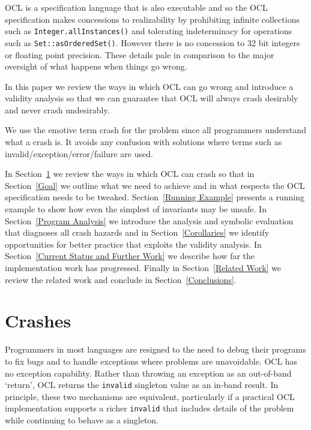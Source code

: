\documentclass[
]{ceurart}
\begin{document}
OCL is a specification language that is also executable and so the OCL specification makes concessions to realizability by prohibiting infinite collections such as \verb|Integer.allInstances()| and tolerating indeterminacy for operations such as \verb|Set::asOrderedSet()|. However there is no concession to 32 bit integers or floating point precision. These details pale in comparison to the major oversight of what happens when things go wrong.

In this paper we review the ways in  which OCL can go wrong and introduce a validity analysis so that we can guarantee that OCL will always crash desirably and never crash undesirably.

We use the emotive term crash for the problem since all programmers understand what a crash is. It avoids any confusion with solutions where terms such as invalid/exception/error/failure are used.

In Section~\ref{Crashes} we review the ways in which OCL can crash so that in Section~\ref{Goal} we outline what we need to achieve and in what respects the OCL specification needs to be tweaked. Section~\ref{Running Example} presents a running example to show how even the simplest of invariants may be unsafe. In Section~\ref{Program Analysis} we introduce the analysis and symbolic evaluation that diagnoses all crash hazards and in Section~\ref{Corollaries} we identify opportunities for better practice that exploits the validity analysis. In Section~\ref{Current Status and Further Work} we describe how far the implementation work has progressed.  Finally in Section~\ref{Related Work} we review the related work and conclude in Section~\ref{Conclusions}.

\section{Crashes}\label{Crashes}

Programmers in most languages are resigned to the need to debug their programs to fix bugs and to handle exceptions where problems are unavoidable. OCL has no exception capability. Rather than throwing an exception as an out-of-band `return', OCL returns the \verb|invalid| singleton value as an in-band result. In principle, these two mechanisms are equivalent, particularly if a practical OCL implementation supports a richer \verb|invalid| that includes details of the problem while continuing to behave as a singleton.
\end{document}
